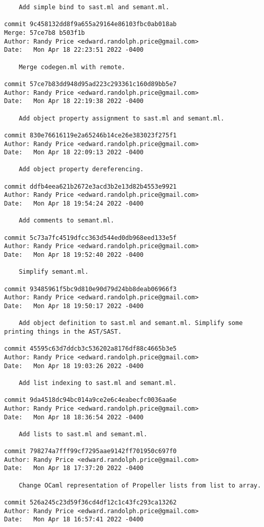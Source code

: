 {\begin{verbatim}
    Add simple bind to sast.ml and semant.ml.

commit 9c458132dd8f9a655a29164e86103fbc0ab018ab
Merge: 57ce7b8 b503f1b
Author: Randy Price <edward.randolph.price@gmail.com>
Date:   Mon Apr 18 22:23:51 2022 -0400

    Merge codegen.ml with remote.

commit 57ce7b83dd948d95ad223c293361c160d89bb5e7
Author: Randy Price <edward.randolph.price@gmail.com>
Date:   Mon Apr 18 22:19:38 2022 -0400

    Add object property assignment to sast.ml and semant.ml.

commit 830e76616119e2a65246b14ce26e383023f275f1
Author: Randy Price <edward.randolph.price@gmail.com>
Date:   Mon Apr 18 22:09:13 2022 -0400

    Add object property dereferencing.

commit ddfb4eea621b2672e3acd3b2e13d82b4553e9921
Author: Randy Price <edward.randolph.price@gmail.com>
Date:   Mon Apr 18 19:54:24 2022 -0400

    Add comments to semant.ml.

commit 5c73a7fc4519dfcc363d544ed0db968eed133e5f
Author: Randy Price <edward.randolph.price@gmail.com>
Date:   Mon Apr 18 19:52:40 2022 -0400

    Simplify semant.ml.

commit 93485961f5bc9d810e90d79d24bb8deab06966f3
Author: Randy Price <edward.randolph.price@gmail.com>
Date:   Mon Apr 18 19:50:17 2022 -0400

    Add object definition to sast.ml and semant.ml. Simplify some printing things in the AST/SAST.

commit 45595c63d7ddcb3c536202a8176df88c4665b3e5
Author: Randy Price <edward.randolph.price@gmail.com>
Date:   Mon Apr 18 19:03:26 2022 -0400

    Add list indexing to sast.ml and semant.ml.

commit 9da4518dc94bc014a9ce2e6c4eabecfc0036aa6e
Author: Randy Price <edward.randolph.price@gmail.com>
Date:   Mon Apr 18 18:36:54 2022 -0400

    Add lists to sast.ml and semant.ml.

commit 798274a7fff99cf7295aae9142ff701950c697f0
Author: Randy Price <edward.randolph.price@gmail.com>
Date:   Mon Apr 18 17:37:20 2022 -0400

    Change OCaml representation of Propeller lists from list to array.

commit 526a245c23d59f36cd4df12c1c43fc293ca13262
Author: Randy Price <edward.randolph.price@gmail.com>
Date:   Mon Apr 18 16:57:41 2022 -0400


\end{verbatim}}
